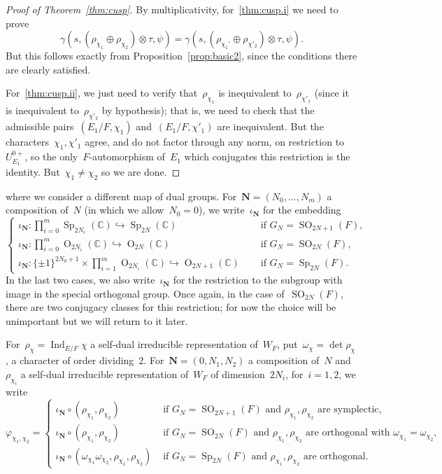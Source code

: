 \documentclass[12pt]{amsart}
\newcommand{\BC}{\mathbb {C}}
\def\bsN{{\boldsymbol{N}}}
\newcommand{\Ind}{\operatorname{Ind}}
\newcommand{\OO}{\operatorname{O}}
\newcommand{\SO}{\operatorname{SO}}
\newcommand{\Sp}{\operatorname{Sp}}
\begin{document}
\begin{proof}[Proof of Theorem~\ref{thm:cusp}]
By multiplicativity, for~\ref{thm:cusp.i} we need to prove
\[
\gamma(s, (\rho_{\chi_1}\oplus\rho_{\chi_2}) \otimes \tau, \psi) = \gamma(s, (\rho_{\chi_1'}\oplus\rho_{\chi'_2}) \otimes \tau, \psi).
\]
But this follows exactly from Proposition~\ref{prop:basic2}, since the conditions there are clearly satisfied. 

For~\ref{thm:cusp.ii}, we just need to verify that~$\rho_{\chi_1}$ is inequivalent to~$\rho_{\chi'_1}$ (since it is inequivalent to~$\rho_{\chi'_2}$ by hypothesis); that is, we need to check that the admissible pairs~$(E_1/F,\chi_1)$ and~$(E_1/F,\chi'_1)$ are inequivalent. But the characters~$\chi_1,\chi'_1$ agree, and do not factor through any norm, on restriction to~$U_{E_1}^{0+}$, so the only~$F$-automorphism of~$E_1$ which conjugates this restriction is the identity. But~$\chi_1\ne\chi_2$ so we are done.
\end{proof} 

\iffalse
where we consider a different map of dual groups. For~$\bsN=(N_0,\ldots,N_m)$ a composition of~$N$ (in which we allow~$N_0=0$), we write~$\iota_\bsN$ for the embedding
\[
\begin{cases}
\iota_\bsN:\prod_{i=0}^m \Sp_{2N_i}(\BC) \hookrightarrow \Sp_{2N}(\BC) &\text{ if }G_N=\SO_{2N+1}(F),\\
\iota_\bsN:\prod_{i=0}^m \OO_{2N_i}(\BC) \hookrightarrow \OO_{2N}(\BC) &\text{ if }G_N=\SO_{2N}(F),\\
\iota_\bsN:\{\pm 1\}^{2N_0+1} \times \prod_{i=1}^m \OO_{2N_i}(\BC) \hookrightarrow \OO_{2N+1}(\BC)\quad &\text{ if }G_N=\Sp_{2N}(F).
\end{cases}
\]
In the last two cases, we also write~$\iota_\bsN$ for the restriction to the subgroup with image in the special orthogonal group. Once again, in the case of~$\SO_{2N}(F)$, there are two conjugacy classes for this restriction; for now the choice will be unimportant but we will return to it later.

For~$\rho_\chi=\Ind_{E/F}\chi$ a self-dual irreducible representation of~$W_F$, put~$\omega_\chi=\det\rho_\chi$, a character of order dividing~$2$. For~$\bsN=(0,N_1,N_2)$ a composition of~$N$ and~$\rho_{\chi_i}$ a self-dual irreducible representation of~$W_F$ of dimension~$2N_i$, for~$i=1,2$, we write
\[
\varphi_{\chi_1,\chi_2} = 
\begin{cases}
\iota_{\bsN}\circ(\rho_{\chi_1},\rho_{\chi_2}) &\text{ if~$G_N=\SO_{2N+1}(F)$ and~$\rho_{\chi_1},\rho_{\chi_2}$ are symplectic},\\
\iota_{\bsN}\circ(\rho_{\chi_1},\rho_{\chi_2}) &\text{ if~$G_N=\SO_{2N}(F)$ and~$\rho_{\chi_1},\rho_{\chi_2}$ are orthogonal with~$\omega_{\chi_1}=\omega_{\chi_2}$},\\
\iota_{\bsN}\circ(\omega_{\chi_1}\omega_{\chi_2},\rho_{\chi_1},\rho_{\chi_2}) &\text{ if~$G_N=\Sp_{2N}(F)$ and~$\rho_{\chi_1},\rho_{\chi_2}$ are orthogonal}.
\end{cases}
\]
\end{document}
